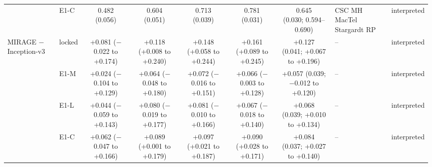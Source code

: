 \begin{longtable}{@{}p{3.2cm}lcccccp{2.4cm}p{2.2cm}@{}}
 & E1-C & \makecell{0.482\\{\scriptsize (0.056)}} & \makecell{0.604\\{\scriptsize (0.051)}} & \makecell{0.713\\{\scriptsize (0.039)}} & \makecell{0.781\\{\scriptsize (0.031)}} & \makecell{0.645\\{\scriptsize (0.030; 0.594--0.690)}} & CSC MH MacTel Stargardt RP & interpreted \\
\addlinespace[2pt]
MIRAGE $-$ Inception-v3 & locked & \makecell{+0.081\\{\scriptsize ($-$0.022 to +0.174)}} & \makecell{+0.118\\{\scriptsize (+0.008 to +0.240)}} & \makecell{+0.148\\{\scriptsize (+0.058 to +0.244)}} & \makecell{+0.161\\{\scriptsize (+0.089 to +0.245)}} & \makecell{+0.127\\{\scriptsize (0.041; +0.067 to +0.196)}} & -- & interpreted \\
 & E1-M & \makecell{+0.024\\{\scriptsize ($-$0.104 to +0.129)}} & \makecell{+0.064\\{\scriptsize ($-$0.048 to +0.180)}} & \makecell{+0.072\\{\scriptsize ($-$0.016 to +0.151)}} & \makecell{+0.066\\{\scriptsize ($-$0.003 to +0.128)}} & \makecell{+0.057\\{\scriptsize (0.039; $-$0.012 to +0.120)}} & -- & interpreted \\
 & E1-L & \makecell{+0.044\\{\scriptsize ($-$0.059 to +0.143)}} & \makecell{+0.080\\{\scriptsize ($-$0.019 to +0.177)}} & \makecell{+0.081\\{\scriptsize ($-$0.010 to +0.166)}} & \makecell{+0.067\\{\scriptsize ($-$0.018 to +0.140)}} & \makecell{+0.068\\{\scriptsize (0.039; +0.010 to +0.134)}} & -- & interpreted \\
 & E1-C & \makecell{+0.062\\{\scriptsize ($-$0.047 to +0.166)}} & \makecell{+0.089\\{\scriptsize (+0.001 to +0.179)}} & \makecell{+0.097\\{\scriptsize (+0.021 to +0.187)}} & \makecell{+0.090\\{\scriptsize (+0.028 to +0.171)}} & \makecell{+0.084\\{\scriptsize (0.037; +0.027 to +0.140)}} & -- & interpreted \\

\end{longtable}
